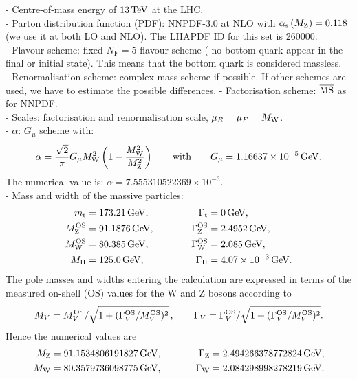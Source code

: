 \documentclass[a4paper,10pt]{report}
\begin{document}
- Centre-of-mass energy of $13\,\text{TeV}$ at the LHC. \\
%
- Parton distribution function (PDF): NNPDF-3.0 at NLO with $\alpha_{\rm s} \left( M_\text{Z} \right) = 0.118$ (we use it at both LO and NLO). The
LHAPDF ID for this set is 260000.\\
%
- Flavour scheme: fixed $N_\text{F}=5$ flavour scheme ( no bottom quark appear in the final or initial state). 
This means that the bottom quark is considered massless. \\
%
- Renormalisation scheme: complex-mass scheme if possible. If other schemes are used, we have to estimate the possible differences.
%
- Factorisation scheme: ${\overline{\rm MS}}$ as for NNPDF. \\
%
- Scales: factorisation and renormalisation scale, $\mu_R = \mu_F = M_\text{W}$. \\
%
- $\alpha$: $G_\mu$ scheme with:
%
\begin{equation}
  \alpha = \frac{\sqrt{2}}{\pi} G_\mu M_\text{W}^2 \left( 1 - \frac{M_\text{W}^2}{M_\text{Z}^2} \right)  \qquad \text{with}  \qquad   G_\mu    = 1.16637\times 10^{-5}\,\text{GeV}.            
\end{equation}
%
The numerical value is: $\alpha = 7.555310522369 \times 10^{-3}$. \\
%
- Mass and width of the massive particles:
% 
\begin{alignat}{2}
                  m_\text{t}   &=  173.21\,\text{GeV},       & \quad \quad \quad \Gamma_\text{t} &= 0 \,\text{GeV},  \nonumber \\
                M_\text{Z}^\text{OS} &=  91.1876\,\text{GeV},      & \quad \quad \quad \Gamma_\text{Z}^\text{OS} &= 2.4952\,\text{GeV},  \nonumber \\
                M_\text{W}^\text{OS} &=  80.385\,\text{GeV},       & \Gamma_\text{W}^\text{OS} &= 2.085\,\text{GeV},  \nonumber \\
                M_{\rm H} &=  125.0\,\text{GeV},       &  \Gamma_\text{H}   &=  4.07 \times 10^{-3}\,\text{GeV}.
\end{alignat}
%
The pole masses and widths entering the calculation are expressed in terms of the measured on-shell (OS) values for the W and Z bosons according to
%
\begin{equation}
        M_V = M_V^\text{OS}/\sqrt{1+(\Gamma_V^\text{OS}/M_V^\text{OS})^2}\,,\qquad  \Gamma_V = \Gamma_V^\text{OS}/\sqrt{1+(\Gamma_V^\text{OS}/M_V^\text{OS})^2}.
\end{equation}
%
Hence the numerical values are
\begin{alignat}{2}
                M_\text{Z} &=  91.1534806191827\,\text{GeV},      & \quad \quad \quad \Gamma_\text{Z} &= 2.494266378772824\,\text{GeV},  \nonumber \\
                M_\text{W} &=  80.3579736098775\,\text{GeV},       & \Gamma_\text{W} &= 2.084298998278219\,\text{GeV}.
\end{alignat}
\end{document}
